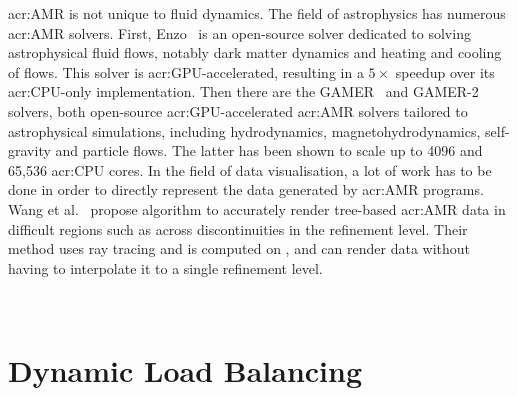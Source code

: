 \Acrlong{acr:AMR} is not unique to fluid dynamics. The field of astrophysics has numerous
\acrshort{acr:AMR} solvers. First, Enzo~\cite{Bryan2014} is an open-source solver dedicated to
solving astrophysical fluid flows, notably dark matter dynamics and heating and cooling of flows.
This solver is \acrshort{acr:GPU}-accelerated, resulting in a \(5 \times \) speedup over its
\acrshort{acr:CPU}-only implementation. Then there are the GAMER~\cite{Schive2010} and
GAMER-2~\cite{Schive2018} solvers, both open-source \acrshort{acr:GPU}-accelerated
\acrshort{acr:AMR} solvers tailored to astrophysical simulations, including hydrodynamics,
magnetohydrodynamics, self-gravity and particle flows. The latter has been shown to scale up to 4096
 and 65,536 \acrshort{acr:CPU} cores. In the field of data visualisation, a lot
of work has to be done in order to directly represent the data generated by \acrshort{acr:AMR}
programs. Wang et al.~\cite{Wang2020} propose algorithm to accurately render tree-based
\acrshort{acr:AMR} data in difficult regions such as across discontinuities in the refinement level.
Their method uses ray tracing and is computed on , and can render data without
having to interpolate it to a single refinement level.

~\cite{Giuliani2019} %

\section{Dynamic Load Balancing}\label{section:literature_review:load_balancing}


~\cite{Karypis1997} %
~\cite{Karypis1997P} %

~\cite{MacNeice2000} %
~\cite{Peplinski2016} %
~\cite{Schive2018} %
